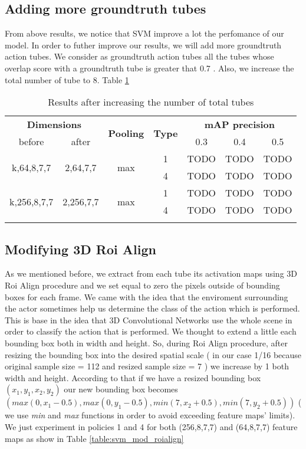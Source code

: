 \subsection{Adding more groundtruth tubes}
From above results, we notice that SVM improve a lot the perfomance of our model. In order to futher improve our results, we will
add more groundtruth action tubes. We consider as groundtruth action tubes all the tubes whose overlap score  with a groundtruth tube is
greater that 0.7 . Also, we increase the total number of tube to 8. Table \ref{table:svm_increased}

\begin{center}
\begin{longtable}{||c | c| c| c||c c c||}

  \hline
 \multicolumn{2}{||c|}{\textbf{Dimensions}} & \multirow{2}{*}{\textbf{Pooling}} &\multirow{2}{*}{ \textbf{Type}} &\multicolumn{3}{|c||}{\textbf{mAP precision}}\\

  before & after & {} & {} & 0.3 &  0.4 & 0.5 \\
  \hline   \hline

  \multirow{2}{*}{k,64,8,7,7} & \multirow{2}{*}{2,64,7,7} & \multirow{2}{*}{max}  & 1 & TODO & TODO & TODO \\
  \cline{4-7}
  {} & {} & {} & 4 & TODO & TODO & TODO   \\
  \hline   
  \multirow{2}{*}{k,256,8,7,7} & \multirow{2}{*}{2,256,7,7} & \multirow{2}{*}{max}  & 1 & TODO & TODO & TODO \\
  \cline{4-7}
  {} & {} & {} & 4 & TODO & TODO & TODO   \\
  \hline   
  \caption{Results after increasing the number of total tubes }
  \label{table:svm_increased}

\end{longtable} 
\end{center}


\subsection{Modifying 3D Roi Align}
As we mentioned before, we extract from each tube its activation maps using 3D Roi Align procedure and we set equal to zero the pixels outside
of bounding boxes for each frame. We came with the idea that the enviroment surrounding the actor sometimes help us determine the class
of the action which is performed. This is base in the idea that 3D Convolutional Networks use the whole scene in order to classify the action
that is performed. We thought to extend a little each bounding box both in width and height. So, during Roi Align procedure, after resizing
the bounding box into the desired spatial scale  ( in our case 1/16 because original sample size = 112 and resized sample size = 7 )
we increase by 1 both width and height. According to that if we have a resized bounding box $( x_1,y_1,x_2,y_2) $ our new bounding box becomes
$ (max(0,x_1-0.5),max(0,y_1-0.5),min(7,x_2+0.5),min(7,y_2+0.5)) $ ( we use \textit{ min} and \textit{max} functions in order to avoid exceeding feature maps' limits).
We just experiment in policies 1 and 4 for both (256,8,7,7) and (64,8,7,7) feature maps as show in  Table \ref{table:svm_mod_roialign}

